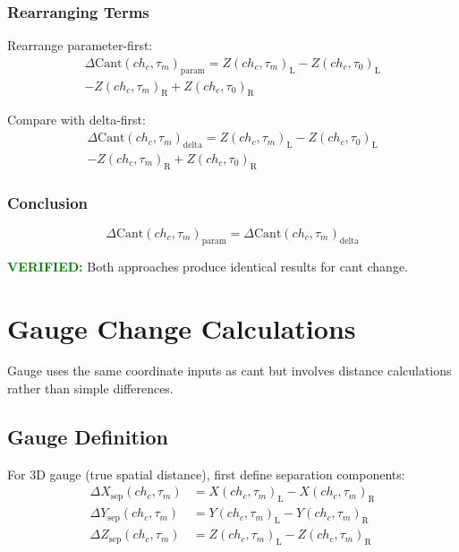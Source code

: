 \documentclass{article}
\newcommand{\chainage}[1]{ch_{#1}}
\newcommand{\Left}{\text{L}}
\newcommand{\Right}{\text{R}}
\newcommand{\X}[3]{X(#1, #2)_{#3}}
\newcommand{\Y}[3]{Y(#1, #2)_{#3}}
\newcommand{\Z}[3]{Z(#1, #2)_{#3}}
\newcommand{\DCant}[2]{\Delta\text{Cant}(#1, #2)}
\newcommand{\SepX}[2]{\Delta X_{\text{sep}}(#1, #2)}
\newcommand{\SepY}[2]{\Delta Y_{\text{sep}}(#1, #2)}
\newcommand{\SepZ}[2]{\Delta Z_{\text{sep}}(#1, #2)}
\begin{document}
\subsubsection{Rearranging Terms}
Rearrange parameter-first:
\begin{multline}
\DCant{\chainage{c}}{\tau_m}_{\text{param}} = \Z{\chainage{c}}{\tau_m}{\Left} - \Z{\chainage{c}}{\tau_0}{\Left} \\
- \Z{\chainage{c}}{\tau_m}{\Right} + \Z{\chainage{c}}{\tau_0}{\Right}
\end{multline}

Compare with delta-first:
\begin{multline}
\DCant{\chainage{c}}{\tau_m}_{\text{delta}} = \Z{\chainage{c}}{\tau_m}{\Left} - \Z{\chainage{c}}{\tau_0}{\Left} \\
- \Z{\chainage{c}}{\tau_m}{\Right} + \Z{\chainage{c}}{\tau_0}{\Right}
\end{multline}

\subsubsection{Conclusion}
\begin{equation}
\boxed{\DCant{\chainage{c}}{\tau_m}_{\text{param}} = \DCant{\chainage{c}}{\tau_m}_{\text{delta}}}
\end{equation}

\textcolor{green}{\textbf{VERIFIED:}} Both approaches produce identical results for cant change.

\section{Gauge Change Calculations}
Gauge uses the same coordinate inputs as cant but involves distance calculations rather than simple differences.

\subsection{Gauge Definition}
For 3D gauge (true spatial distance), first define separation components:
\begin{align}
\SepX{\chainage{c}}{\tau_m} &= \X{\chainage{c}}{\tau_m}{\Left} - \X{\chainage{c}}{\tau_m}{\Right} \\
\SepY{\chainage{c}}{\tau_m} &= \Y{\chainage{c}}{\tau_m}{\Left} - \Y{\chainage{c}}{\tau_m}{\Right} \\
\SepZ{\chainage{c}}{\tau_m} &= \Z{\chainage{c}}{\tau_m}{\Left} - \Z{\chainage{c}}{\tau_m}{\Right}
\end{align}
\end{document}
